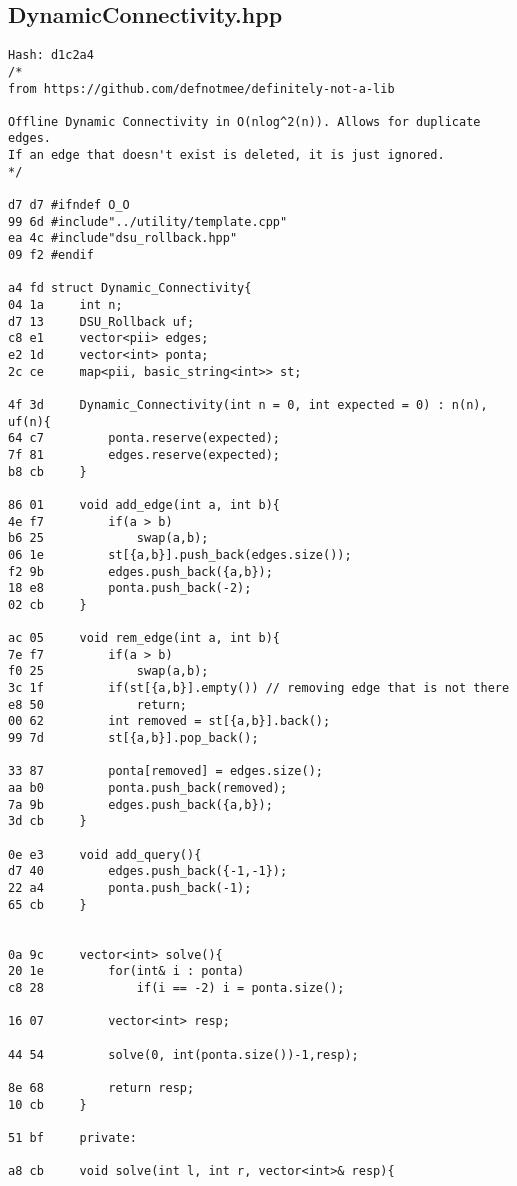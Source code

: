 \documentclass[11pt, a4paper, twoside]{article}
\begin{document}
\subsection{DynamicConnectivity.hpp}
\begin{lstlisting}
Hash: d1c2a4
/*
from https://github.com/defnotmee/definitely-not-a-lib

Offline Dynamic Connectivity in O(nlog^2(n)). Allows for duplicate edges.
If an edge that doesn't exist is deleted, it is just ignored.
*/

d7 d7 #ifndef O_O
99 6d #include"../utility/template.cpp"
ea 4c #include"dsu_rollback.hpp"
09 f2 #endif

a4 fd struct Dynamic_Connectivity{
04 1a     int n;
d7 13     DSU_Rollback uf;
c8 e1     vector<pii> edges;
e2 1d     vector<int> ponta;
2c ce     map<pii, basic_string<int>> st;
      
4f 3d     Dynamic_Connectivity(int n = 0, int expected = 0) : n(n), uf(n){
64 c7         ponta.reserve(expected);
7f 81         edges.reserve(expected);
b8 cb     }
      
86 01     void add_edge(int a, int b){
4e f7         if(a > b)
b6 25             swap(a,b);
06 1e         st[{a,b}].push_back(edges.size());
f2 9b         edges.push_back({a,b});
18 e8         ponta.push_back(-2);
02 cb     }
      
ac 05     void rem_edge(int a, int b){
7e f7         if(a > b)
f0 25             swap(a,b);
3c 1f         if(st[{a,b}].empty()) // removing edge that is not there
e8 50             return;
00 62         int removed = st[{a,b}].back();
99 7d         st[{a,b}].pop_back();
              
33 87         ponta[removed] = edges.size();
aa b0         ponta.push_back(removed);
7a 9b         edges.push_back({a,b});
3d cb     }
      
0e e3     void add_query(){
d7 40         edges.push_back({-1,-1});
22 a4         ponta.push_back(-1);
65 cb     }
      
      
0a 9c     vector<int> solve(){
20 1e         for(int& i : ponta)
c8 28             if(i == -2) i = ponta.size();
              
16 07         vector<int> resp;
      
44 54         solve(0, int(ponta.size())-1,resp);
      
8e 68         return resp;
10 cb     }
      
51 bf     private:
      
a8 cb     void solve(int l, int r, vector<int>& resp){
      

\end{lstlisting}
\end{document}
